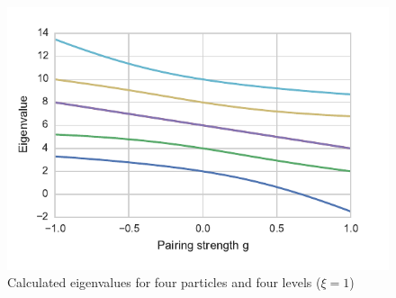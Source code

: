 \documentclass{article}
\begin{document}
	\begin{figure}[p]
		\centering
		\includegraphics{calc4.pdf}
		\caption{Calculated eigenvalues for four particles and four levels ($\xi=1$)}
		\label{fig:4lev_calc}
	\end{figure}
\end{document}
